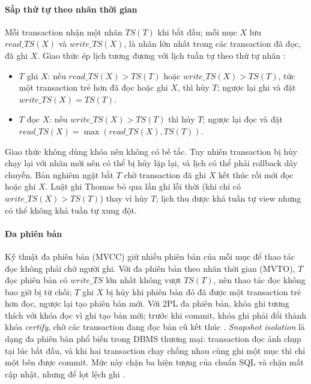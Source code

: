 \paragraph{Sắp thứ tự theo nhãn thời gian}
Mỗi transaction nhận một nhãn $TS(T)$ khi bắt đầu; mỗi mục $X$ lưu $\mathit{read\_TS}(X)$ và $\mathit{write\_TS}(X)$, là nhãn lớn nhất trong các transaction đã đọc, đã ghi $X$. Giao thức ép lịch tương đương với lịch tuần tự theo thứ tự nhãn \cite{cc-silberschatz2019, cc-elmasri2016}:
\begin{itemize}
  \item $T$ ghi $X$: nếu $\mathit{read\_TS}(X) > TS(T)$ hoặc $\mathit{write\_TS}(X) > TS(T)$, tức một transaction trẻ hơn đã đọc hoặc ghi $X$, thì hủy $T$; ngược lại ghi và đặt $\mathit{write\_TS}(X) = TS(T)$.
  \item $T$ đọc $X$: nếu $\mathit{write\_TS}(X) > TS(T)$ thì hủy $T$; ngược lại đọc và đặt $\mathit{read\_TS}(X) = \max(\mathit{read\_TS}(X), TS(T))$.
\end{itemize}
Giao thức không dùng khóa nên không có bế tắc. Tuy nhiên transaction bị hủy chạy lại với nhãn mới nên có thể bị hủy lặp lại, và lịch có thể phải rollback dây chuyền. Bản nghiêm ngặt bắt $T$ chờ transaction đã ghi $X$ kết thúc rồi mới đọc hoặc ghi $X$. Luật ghi Thomas bỏ qua lần ghi lỗi thời (khi chỉ có $\mathit{write\_TS}(X) > TS(T)$) thay vì hủy $T$; lịch thu được khả tuần tự view nhưng có thể không khả tuần tự xung đột.

\paragraph{Đa phiên bản}
Kỹ thuật đa phiên bản (MVCC) giữ nhiều phiên bản của mỗi mục để thao tác đọc không phải chờ người ghi. Với đa phiên bản theo nhãn thời gian (MVTO), $T$ đọc phiên bản có $\mathit{write\_TS}$ lớn nhất không vượt $TS(T)$, nên thao tác đọc không bao giờ bị từ chối; $T$ ghi $X$ bị hủy khi phiên bản đó đã được một transaction trẻ hơn đọc, ngược lại tạo phiên bản mới. Với 2PL đa phiên bản, khóa ghi tương thích với khóa đọc vì ghi tạo bản mới; trước khi commit, khóa ghi phải đổi thành khóa \emph{certify}, chờ các transaction đang đọc bản cũ kết thúc \cite{cc-elmasri2016}. \emph{Snapshot isolation} là dạng đa phiên bản phổ biến trong DBMS thương mại: transaction đọc ảnh chụp tại lúc bắt đầu, và khi hai transaction chạy chồng nhau cùng ghi một mục thì chỉ một bên được commit. Mức này chặn ba hiện tượng của chuẩn SQL và chặn mất cập nhật, nhưng để lọt lệch ghi \cite{cc-berenson1995}.

